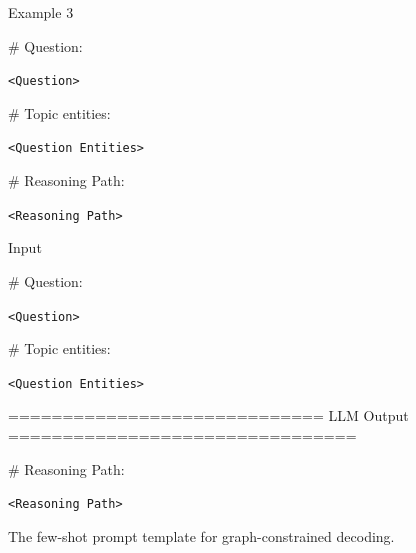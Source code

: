 \begin{figure}[h]
\begin{minipage}{0.99\columnwidth}
\begin{tcolorbox}[title=Few-shot Graph-constrained Decoding Prompt]
            \vspace{10pt}

            Example 3

            \vspace{10pt}

            \# Question: 
            
            \texttt{<Question>}

            \vspace{10pt}

            \# Topic entities:

            \texttt{<Question Entities>}

            \vspace{10pt}
            
            \# Reasoning Path: 
            
            \texttt{<Reasoning Path>}

            \vspace{10pt}

            Input

            \vspace{10pt}

            \# Question: 
            
            \texttt{<Question>}

            \vspace{10pt}

            \# Topic entities:

            \texttt{<Question Entities>}
    
            \vspace{10pt}
            ============================= LLM Output ================================
    
            \# Reasoning Path: 
            
            \texttt{<Reasoning Path>}
        \end{tcolorbox}
        \vspace{1mm}
    \end{minipage}
    \caption{The few-shot prompt template for graph-constrained decoding.}
    \label{fig:few_shotpath_gen_prompt}
\end{figure}